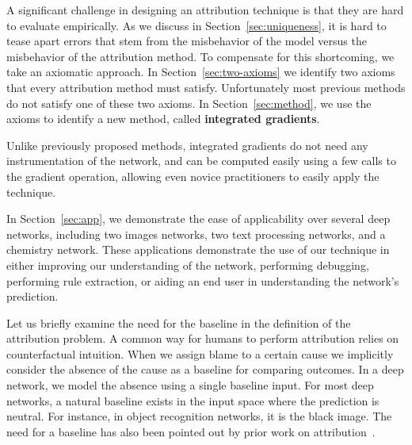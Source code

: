 A significant challenge in designing an attribution technique is that
they are hard to evaluate empirically. As we discuss in
Section~\ref{sec:uniqueness}, it is hard to tease apart errors that
stem from the misbehavior of the model versus the misbehavior of the
attribution method. To compensate for this shortcoming, we take an
axiomatic approach. In Section~\ref{sec:two-axioms} we identify two
axioms that every attribution method must satisfy. Unfortunately
most previous methods do not satisfy one of these two axioms.
In Section~\ref{sec:method}, we use the axioms to identify a new method,
called \textbf{integrated gradients}.

Unlike previously proposed methods, integrated gradients do not need
any instrumentation of the network, and can be computed easily using
a few calls to the gradient operation, allowing even novice
practitioners to easily apply the technique.

In Section~\ref{sec:app}, we demonstrate the ease of applicability over
several deep networks, including two images networks, two
text processing networks, and a chemistry network. These
applications demonstrate the use of our technique in either improving
our understanding of the network, performing debugging, performing rule
extraction, or aiding an end user in understanding the network's
prediction.

\begin{remark}
  \label{rem:baseline}
  Let us briefly examine the need for the baseline in the definition of
  the attribution problem.
  A common way for humans to perform attribution relies on counterfactual intuition.
  When we assign blame to a certain cause we implicitly consider the absence of
  the cause as a baseline for comparing outcomes. In a deep network, we model
  the absence using a single baseline input. For most deep networks, a natural
  baseline exists in the input space where the prediction is neutral. For instance,
  in object recognition networks, it is the black image. The need for a baseline
  has also been pointed out by prior work on attribution~\cite{SGSK16, BMBMS16}.
\end{remark}

